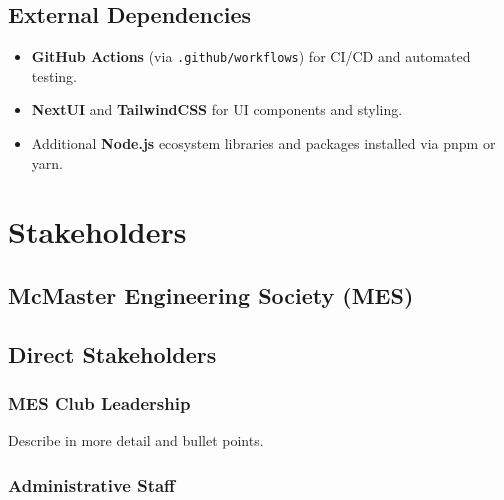 \documentclass[12pt]{article}
\begin{document}
    \subsection{External Dependencies}
    \begin{itemize}
        \item \textbf{GitHub Actions} (via \texttt{.github/workflows}) for CI/CD and automated testing.
        \item \textbf{NextUI} and \textbf{TailwindCSS} for UI components and styling.
        \item Additional \textbf{Node.js} ecosystem libraries and packages installed via pnpm or yarn.
    \end{itemize}


\section{Stakeholders}

  \subsection{McMaster Engineering Society (MES)}
  
  \subsection{Direct Stakeholders}
  
    \subsubsection{MES Club Leadership}
    Describe in more detail and bullet points.

    \subsubsection{Administrative Staff}
\end{document}

